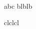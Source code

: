\documentclass[12pt,oneside]{article}
\begin{document}
abc
\newpage
blblb

\newpage
clclcl 
\end{document}
